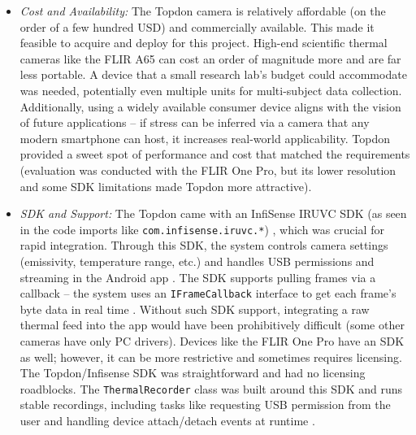 \begin{itemize}
  \item \emph{Cost and Availability:} The Topdon camera is relatively affordable (on the order of a few hundred USD) and commercially available. This made it feasible to acquire and deploy for this project. High-end scientific thermal cameras like the FLIR A65 can cost an order of magnitude more and are far less portable. A device that a small research lab's budget could accommodate was needed, potentially even multiple units for multi-subject data collection. Additionally, using a widely available consumer device aligns with the vision of future applications -- if stress can be inferred via a camera that any modern smartphone can host, it increases real-world applicability. Topdon provided a sweet spot of performance and cost that matched the requirements (evaluation was conducted with the FLIR One Pro, but its lower resolution and some SDK limitations made Topdon more attractive).
  \item \emph{SDK and Support:} The Topdon came with an InfiSense IRUVC SDK (as seen in the code imports like \texttt{com.infisense.iruvc.*}) \cite{ref16}, which was crucial for rapid integration. Through this SDK, the system controls camera settings (emissivity, temperature range, etc.) and handles USB permissions and streaming in the Android app \cite{ref16}. The SDK supports pulling frames via a callback -- the system uses an \texttt{IFrameCallback} interface to get each frame's byte data in real time \cite{ref16}. Without such SDK support, integrating a raw thermal feed into the app would have been prohibitively difficult (some other cameras have only PC drivers). Devices like the FLIR One Pro have an SDK as well; however, it can be more restrictive and sometimes requires licensing. The Topdon/Infisense SDK was straightforward and had no licensing roadblocks. The \texttt{ThermalRecorder} class was built around this SDK and runs stable recordings, including tasks like requesting USB permission from the user and handling device attach/detach events at runtime \cite{ref16}.

\end{itemize}
